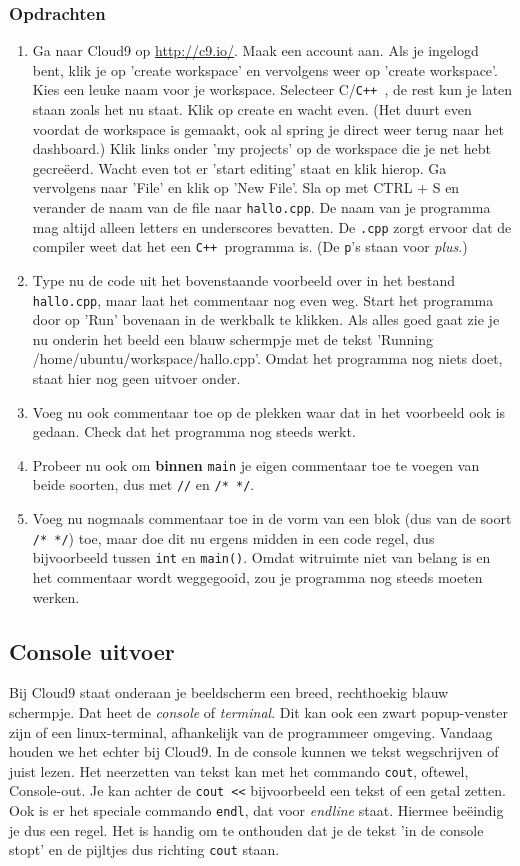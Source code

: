 \documentclass[12pt,a4paper]{article}
\newcommand{\icode}{\lstinline}
\newcommand{\mono}{\texttt}
\newcommand{\cpp}{\mono{C++ }}
\begin{document}
\subsubsection{Opdrachten}
\begin{enumerate}
	\item
		Ga naar Cloud9 op \url{http://c9.io/}. Maak een account aan. Als je ingelogd bent, klik je op 'create workspace' en vervolgens weer op 'create workspace'. Kies een leuke naam voor je workspace. Selecteer C/\cpp, de rest kun je laten staan zoals het nu staat. Klik op create en wacht even. (Het duurt even voordat de workspace is gemaakt, ook al spring je direct weer terug naar het dashboard.) Klik links onder 'my projects' op de workspace die je net hebt gecreëerd. Wacht even tot er 'start editing' staat en klik hierop. Ga vervolgens naar 'File' en klik op 'New File'. Sla op met CTRL + S en verander de naam van de file naar \mono{hallo.cpp}. De naam van je programma mag altijd alleen letters en underscores bevatten. De \mono{.cpp} zorgt ervoor dat de compiler weet dat het een \cpp programma is. (De \mono{p}'s staan voor \emph{plus}.)
		
	\item 
		Type nu de code uit het bovenstaande voorbeeld over in het bestand \mono{hallo.cpp}, maar laat het commentaar nog even weg. Start het programma door op 'Run' bovenaan in de werkbalk te klikken. Als alles goed gaat zie je nu onderin het beeld een blauw schermpje met de tekst 'Running /home/ubuntu/workspace/hallo.cpp'. Omdat het programma nog niets doet, staat hier nog geen uitvoer onder.
	\item
		Voeg nu ook commentaar toe op de plekken waar dat in het voorbeeld ook is gedaan. Check dat het programma nog steeds werkt.
	\item
		Probeer nu ook om \textbf{binnen} \icode{main} je eigen commentaar toe te voegen van beide soorten, dus met \icode{//} en \icode{/* */}.
	\item 
		Voeg nu nogmaals commentaar toe in de vorm van een blok (dus van de soort \icode{/* */}) toe, maar doe dit nu ergens midden in een code regel, dus bijvoorbeeld tussen \icode{int} en \icode{main()}. Omdat witruimte niet van belang is en het commentaar wordt weggegooid, zou je programma nog steeds moeten werken.
\end{enumerate}

\subsection{Console uitvoer}
Bij Cloud9 staat onderaan je beeldscherm een breed, rechthoekig blauw schermpje. Dat heet de \emph{console} of \emph{terminal}. Dit kan ook een zwart popup-venster zijn of een linux-terminal, afhankelijk van de programmeer omgeving. Vandaag houden we het echter bij Cloud9. In de console kunnen we tekst wegschrijven of juist lezen. Het neerzetten van tekst kan met het commando \icode{cout}, oftewel, Console-out. Je kan achter de \icode{cout <<} bijvoorbeeld een tekst of een getal zetten. Ook is er het speciale commando \icode{endl}, dat voor \emph{endline} staat. Hiermee be\"eindig je dus een regel. Het is handig om te onthouden dat je de tekst 'in de console stopt' en de pijltjes dus richting \icode{cout} staan.
\end{document}

